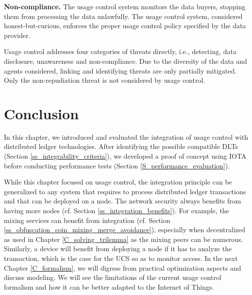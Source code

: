 \textbf{Non-compliance. \cmark} The usage control system monitors the data buyers, stopping them from processing the data unlawfully. The usage control system, considered honest-but-curious, enforces the proper usage control policy specified by the data provider.


Usage control addresses four categories of threats directly, i.e., detecting, data disclosure, unawareness and non-compliance. Due to the diversity of the data and agents considered, linking and identifying threats are only partially mitigated. Only the non-repudiation threat is not considered by usage control.

\section{Conclusion}
\label{S_conclusion_integration}

In this chapter, we introduced and evaluated the integration of usage control with distributed ledger technologies. After identifying the 
possible compatible DLTs (Section \ref{ss_integrability_criteria}), we developed a proof of concept using IOTA before conducting performance tests (Section \ref{S_performance_evaluation}).

While this chapter focused on usage control, the integration principle can be generalized to any system that requires to process
distributed ledger transactions and that can be deployed on a node. 
The network security always benefits from having more nodes (cf. Section \ref{ss_integration_benefits}).
For example, the mixing services can benefit from integration (cf. Section \ref{ss_obfuscation_coin_mixing_merge_avoidance}), especially
when decentralized as used in Chapter \ref{C_solving_trilemma} as the mixing peers can be numerous. 
Similarly, a device will benefit from deploying a node if it has to analyze the transaction, which is the case for the UCS so as to monitor access. In the next Chapter \ref{C_formalism}, we will digress from practical optimization aspects and discuss modeling. We will see the limitations of the current usage control formalism and how it can be better adapted to the Internet of Things.  